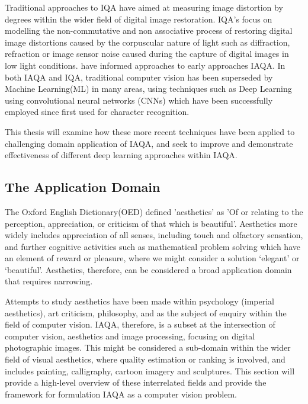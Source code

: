 \par

Traditional approaches to IQA have aimed at measuring image distortion by degrees\cite{gonzalez2008digital} within the wider field of digital image restoration. IQA's focus on modelling the non-commutative and non associative process of restoring digital image distortions caused by the corpuscular nature of light such as diffraction, refraction or image sensor noise caused during the capture of digital images in low light conditions.\cite{szeliski2011computer,gonzalez2008digital} have informed approaches to early approaches IAQA. In both IAQA and IQA, traditional computer vision has been superseded by Machine Learning(ML) in many areas, using techniques such as Deep Learning using convolutional neural networks (CNNs) which have been successfully employed since first used for character recognition\cite{LeCun1989,LeCun1998}.  \par
This thesis will examine how these more recent techniques have been applied to challenging domain application of IAQA, and seek to improve and  demonstrate effectiveness of different deep learning approaches within IAQA.

\newpage


\subsection{The Application Domain}

The Oxford English Dictionary(OED) defined 'aesthetics' as 'Of or relating to the perception, appreciation, or criticism of that which is beautiful'\cite{OED2021}. Aesthetics more widely includes appreciation of all senses, including touch and olfactory sensation\cite{Hayes2015}, and further cognitive activities such as mathematical problem solving which have an element of reward or pleasure, where we might consider a solution `elegant' or `beautiful'\cite{Rolls2014}. Aesthetics, therefore, can be considered a broad application domain that requires narrowing.  

\par

 Attempts to study aesthetics have been made within psychology (imperial aesthetics)\cite{Greb2017}, art criticism, philosophy, and as the subject of enquiry within the field of computer vision. IAQA, therefore, is a subset at the intersection of computer vision, aesthetics and image processing, focusing on digital photographic images. This might be considered a sub-domain within the wider field of visual aesthetics, where quality estimation or ranking is involved, and includes painting, calligraphy, cartoon imagery and sculptures. This section will provide a high-level overview of these interrelated fields and provide the framework for formulation IAQA as a computer vision problem. 

